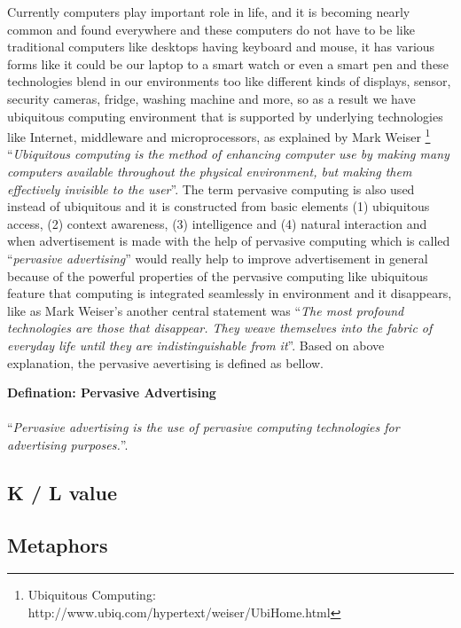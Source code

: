 Currently computers play important role in life, and it is becoming nearly common and found everywhere and these computers do not have to be like traditional computers like desktops having keyboard and mouse, it has various forms like it could be our laptop to a smart watch or even a smart pen and these technologies blend in our environments too like different kinds of displays, sensor, security cameras, fridge, washing machine and more, so as a result we have ubiquitous computing environment that is supported by underlying technologies like Internet, middleware and microprocessors, as explained by Mark Weiser \footnote{Ubiquitous Computing: http://www.ubiq.com/hypertext/weiser/UbiHome.html}  \cite{ubiquitous_computing} ``\emph{Ubiquitous computing is the method of enhancing computer use by making many computers available throughout the physical environment, but making them effectively invisible to the user}''. The term pervasive computing is also used instead of ubiquitous  \cite{pervasiv_ubiquitous} and it is constructed from basic elements \cite{pervais_ad} (1) ubiquitous access, (2) context awareness, (3) intelligence and (4) natural interaction and when advertisement is made with the help of pervasive computing which is called ``\emph{pervasive advertising}'' would really help to improve advertisement in general because of the powerful properties of the pervasive computing like ubiquitous feature that computing is integrated seamlessly in environment and it disappears, like as Mark Weiser’s \cite{twenty_first} another central statement was ``\emph{The most profound technologies are those that disappear. They weave themselves into the fabric of everyday life until they are indistinguishable from it}''. Based on above explanation, the pervasive aevertising is defined as bellow.

\begin{snugshade}
\textbf{Defination: Pervasive Advertising }\\ \\ ``\emph{Pervasive advertising is the use of pervasive computing technologies for advertising purposes.}''\cite{pervasiv_ad}.
\end{snugshade}




\subsection{K / L value}
\subsection{Metaphors}

